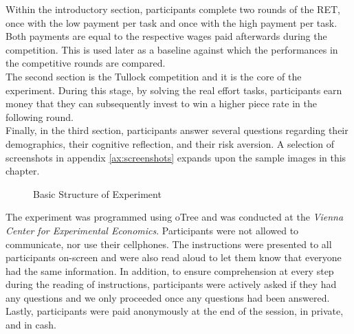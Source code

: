     Within the introductory section, participants complete two rounds of the RET, once with the low payment per task and once with the high payment per task. Both payments are equal to the respective wages paid afterwards during the competition. This is used later as a baseline against which the performances in the competitive rounds are compared.\\
    
    The second section is the Tullock competition and it is the core of the experiment. During this stage, by solving the real effort tasks, participants earn money that they can subsequently invest to win a higher piece rate in the following round.\\
    
    Finally, in the third section, participants answer several questions regarding their demographics, their cognitive reflection, and their risk aversion. A selection of screenshots in appendix \ref{ax:screenshots} expands upon the sample images in this chapter.\\
    
    \begin{figure}
\centering
{}

\caption{Basic Structure of Experiment}
\label{fig:exp_str}
\end{figure}
    
    The experiment was programmed using oTree \citep{chen2016}
    and was conducted at the \textit{Vienna Center for Experimental Economics}. Participants were not allowed to communicate, nor use their cellphones. The instructions were presented to all participants on-screen and were also read aloud to let them know that everyone had the same information. In addition, to ensure comprehension at every step during the reading of instructions, participants were actively asked if they had any questions and we only proceeded once any questions had been answered. Lastly, participants were paid anonymously at the end of the session, in private, and in cash.
    
